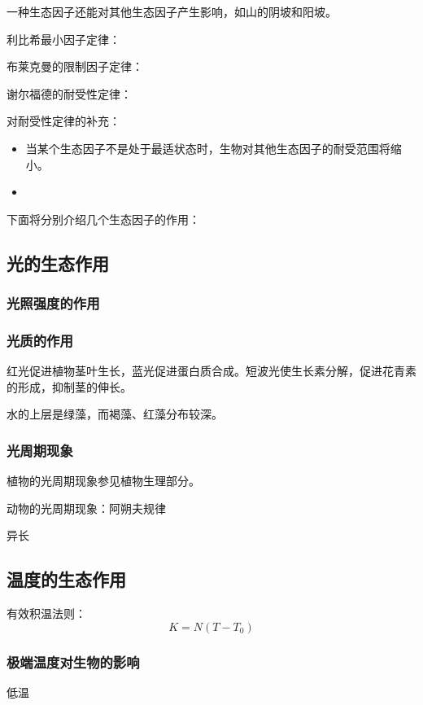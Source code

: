	一种生态因子还能对其他生态因子产生影响，如山的阴坡和阳坡。

	利比希最小因子定律：

	布莱克曼的限制因子定律：

	谢尔福德的耐受性定律：

	对耐受性定律的补充：

	\begin{itemize}
		\item 当某个生态因子不是处于最适状态时，生物对其他生态因子的耐受范围将缩小。
		\item
	\end{itemize}

	下面将分别介绍几个生态因子的作用：

\subsection{光的生态作用}

\subsubsection{光照强度的作用}

\subsubsection{光质的作用}

红光促进植物茎叶生长，蓝光促进蛋白质合成。短波光使生长素分解，促进花青素的形成，抑制茎的伸长。

水的上层是绿藻，而褐藻、红藻分布较深。

\subsubsection{光周期现象}

植物的光周期现象参见植物生理部分。

动物的光周期现象：阿朔夫规律

异长
\subsection{温度的生态作用}

有效积温法则：\[K=N(T-T_0)\]

\subsubsection{极端温度对生物的影响}

低温

